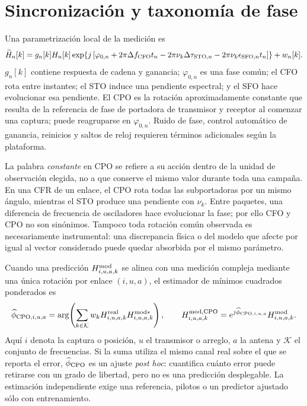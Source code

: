 \section{Sincronización y taxonomía de fase}
\label{sec:phase_taxonomy}

Una parametrización local de la medición es
\begin{equation}
\widetilde H_n[k]=g_n[k]H_n[k]\exp\!\left\{j\left[
\varphi_{0,n}+2\pi\Delta f_{\rm CFO}t_n
-2\pi\nu_k\Delta\tau_{{\rm STO},n}
-2\pi\nu_k\epsilon_{{\rm SFO},n}t_n
\right]\right\}+w_n[k].
\label{eq:hardware_model}
\end{equation}
$g_n[k]$ contiene respuesta de cadena y ganancia; $\varphi_{0,n}$ es una fase
común; el \ac{CFO} rota entre instantes; el \ac{STO} induce una pendiente espectral;
y el \ac{SFO} hace evolucionar esa pendiente. El \ac{CPO} es la rotación
aproximadamente constante que resulta de la referencia de fase de portadora de
transmisor y receptor al comenzar una captura; puede reagruparse en
$\varphi_{0,n}$. Ruido de fase, control automático de ganancia, reinicios y
saltos de reloj requieren términos adicionales según la plataforma.

La palabra \emph{constante} en CPO se refiere a su acción dentro de la unidad de
observación elegida, no a que conserve el mismo valor durante toda una campaña.
En una CFR de un enlace, el CPO rota todas las subportadoras por un mismo ángulo,
mientras el STO produce una pendiente con $\nu_k$. Entre paquetes, una diferencia
de frecuencia de osciladores hace evolucionar la fase; por ello CFO y CPO no son
sinónimos. Tampoco toda rotación común observada es necesariamente instrumental:
una discrepancia física o del modelo que afecte por igual al vector considerado
puede quedar absorbida por el mismo parámetro.

Cuando una predicción $H^{\rm mod}_{i,u,a,k}$ se alinea con una medición compleja
mediante una única rotación por enlace $(i,u,a)$, el estimador de mínimos cuadrados
ponderados es
\begin{equation}
\widehat\phi_{{\rm CPO},i,u,a}
=\arg\!\left(
\sum_{k\in\mathcal K}w_k
H^{\rm real}_{i,u,a,k}H^{{\rm mod}*}_{i,u,a,k}
\right),
\qquad
H^{{\rm mod,CPO}}_{i,u,a,k}
=e^{j\widehat\phi_{{\rm CPO},i,u,a}}H^{\rm mod}_{i,u,a,k}.
\label{eq:cpo_posthoc_alignment}
\end{equation}
Aquí $i$ denota la captura o posición, $u$ el transmisor o arreglo, $a$ la antena
y $\mathcal K$ el conjunto de frecuencias. Si la suma utiliza el mismo canal real
sobre el que se reporta el error, $\widehat\phi_{\rm CPO}$ es un ajuste \emph{post
hoc}: cuantifica cuánto error puede retirarse con un grado de libertad, pero no es
una predicción desplegable. La estimación independiente exige una referencia,
pilotos o un predictor ajustado sólo con entrenamiento.

